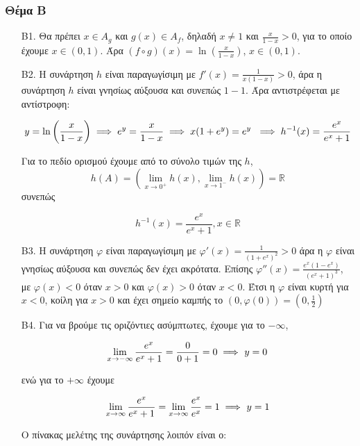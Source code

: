 \documentclass[12pt]{article}
\begin{document}
\part*{}

\section*{Θέμα Β}
  \begin{enumerate}
    \item [B1.] Θα πρέπει $x\in A_g$ και $g(x)\in A_f$, δηλαδή $x\ne1$ και $\frac{x}{1-x} > 0$, για το οποίο έχουμε $x\in (0,1)$. Άρα $(f\circ g)(x)=\ln \left( \frac{x}{1-x}\right)$, $x\in (0,1)$.

    \item [B2.] Η συνάρτηση $h$ είναι παραγωγίσιμη με $f'(x)=\frac{1}{x(1-x)}>0$, άρα η συνάρτηση $h$ είναι γνησίως αύξουσα και συνεπώς $1-1$. Άρα αντιστρέφεται με αντίστροφη:

      $$y=\ln \left( \frac{x}{1-x}\right) \implies e^y=\frac{x}{1-x} \implies x(1+e^y)=e^y \\\
      \implies h^{-1}(x)=\frac{e^x}{e^x+1}$$

      Για το πεδίο ορισμού έχουμε από το σύνολο τιμών της $h$,
      $$h(A)=\left(\lim_{x\to 0^+}h(x),\lim_{x\to 1^-}h(x)\right)=\mathbb{R}$$
      συνεπώς

      $$h^{-1}(x)=\frac{e^x}{e^x+1}, x\in \mathbb{R}$$

    \item [B3.] Η συνάρτηση $φ$ είναι παραγωγίσιμη με $φ'(x)=\displaystyle \frac{1}{(1+e^x)^2}>0$ άρα η $φ$ είναι γνησίως αύξουσα και συνεπώς δεν έχει ακρότατα. Επίσης $φ''(x)=\displaystyle \frac{e^x(1-e^x)}{(e^x+1)^3}$, με $φ(x)<0$ όταν $x>0$ και $φ(x)>0$ όταν $x<0$. Έτσι η $φ$ είναι κυρτή για $x<0$, κοίλη για $x>0$ και έχει σημείο καμπής το $(0,φ(0))=\left(0,\frac{1}{2}\right)$

    \item [B4.] Για να βρούμε τις οριζόντιες ασύμπτωτες, έχουμε για το $-\infty$,

      $$\lim_{x\to -\infty}\frac{e^x}{e^x+1}=\frac{0}{0+1}=0 \implies \\\ y=0$$

      ενώ για το $+\infty$ έχουμε

      $$\lim_{x\to \infty}\frac{e^x}{e^x+1}=\lim_{x\to \infty}\frac{e^x}{e^x}=1 \implies \\\ y=1$$

      Ο πίνακας μελέτης της συνάρτησης λοιπόν είναι ο:


\end{enumerate}
\end{document}
